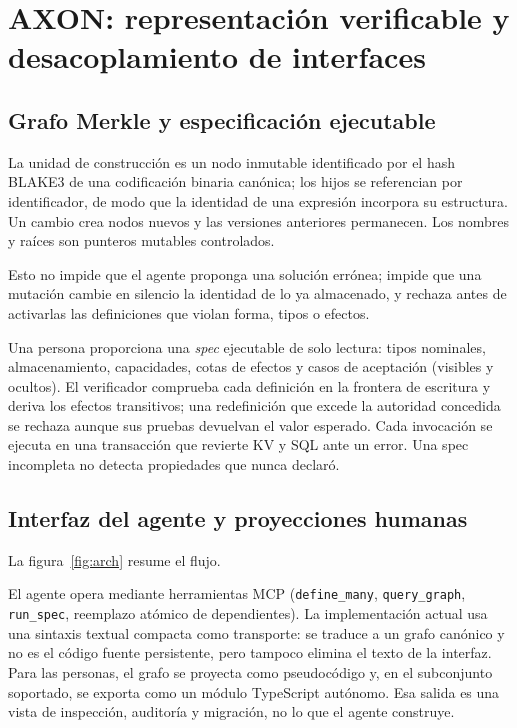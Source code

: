 \documentclass[11pt, a4paper]{article}
\begin{document}
\section{AXON: representación verificable y desacoplamiento de interfaces}
\label{sec:axon}

\subsection{Grafo Merkle y especificación ejecutable}

La unidad de construcción es un nodo inmutable identificado por el hash BLAKE3 de una codificación binaria canónica; los hijos se referencian por identificador, de modo que la identidad de una expresión incorpora su estructura. Un cambio crea nodos nuevos y las versiones anteriores permanecen. Los nombres y raíces son punteros mutables controlados.

Esto no impide que el agente proponga una solución errónea; impide que una mutación cambie en silencio la identidad de lo ya almacenado, y rechaza antes de activarlas las definiciones que violan forma, tipos o efectos.

Una persona proporciona una \emph{spec} ejecutable de solo lectura: tipos nominales, almacenamiento, capacidades, cotas de efectos y casos de aceptación (visibles y ocultos). El verificador comprueba cada definición en la frontera de escritura y deriva los efectos transitivos; una redefinición que excede la autoridad concedida se rechaza aunque sus pruebas devuelvan el valor esperado. Cada invocación se ejecuta en una transacción que revierte KV y SQL ante un error. Una spec incompleta no detecta propiedades que nunca declaró.

\subsection{Interfaz del agente y proyecciones humanas}

La figura~\ref{fig:arch} resume el flujo.

El agente opera mediante herramientas MCP (\texttt{define\_many}, \texttt{query\_graph}, \texttt{run\_spec}, reemplazo atómico de dependientes). La implementación actual usa una sintaxis textual compacta como transporte: se traduce a un grafo canónico y no es el código fuente persistente, pero tampoco elimina el texto de la interfaz. Para las personas, el grafo se proyecta como pseudocódigo y, en el subconjunto soportado, se exporta como un módulo TypeScript autónomo. Esa salida es una vista de inspección, auditoría y migración, no lo que el agente construye.
\end{document}
